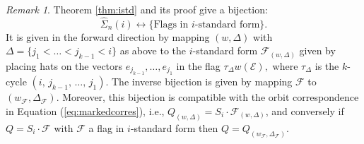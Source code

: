 \documentclass[12pt]{amsart}
\numberwithin{equation}{section}
\theoremstyle{remark}
\newtheorem{rem}[thm]{Remark}
\theoremstyle{definition}
\newcommand{\B}{\mathcal{B}}
\newcommand{\F}{\mathcal{F}}
\begin{document}
\begin{rem}\label{r:combinatorial}
 Theorem \ref{thm:istd} and its proof give a bijection:
$$
\widehat{\Sigma}_{n}(i)\leftrightarrow\{\mbox{Flags in $i$-standard form}\}.
$$
It is given in the forward direction by mapping $(w,\Delta)$ with $\Delta=\{j_{1}<\dots< j_{k-1}<i\}$ as above to the $i$-standard form $\F_{(w,\Delta)}$ given by placing hats on the vectors $e_{j_{k-1}},\dots, e_{j_{1}}$ in the flag $\tau_{\Delta} w(\mathcal{E}),$ where $\tau_{\Delta}$ is the $k$-cycle $(i,\, j_{k-1},\, \dots,\, j_{1}).$   The inverse bijection is given by mapping $\F$ to $(w_{\F},\Delta_{\F}).$  Moreover, this bijection is compatible with the orbit correspondence in Equation (\ref{eq:markedcorres}), i.e., $Q_{(w,\Delta)}=S_{i}\cdot \F_{(w,\Delta)}$, and conversely if $Q=S_{i}\cdot \F$ with $\F$ a flag in $i$-standard form then $Q=Q_{(w_{\F}, \Delta_{\F})}$. 
\end{rem}
\end{document}

